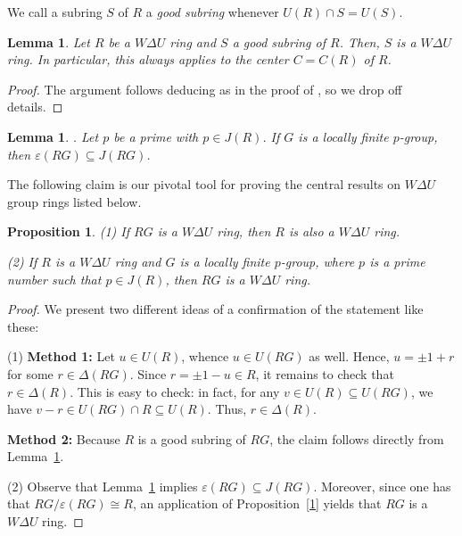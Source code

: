 \documentclass[12pt]{amsart}
\newtheorem{proposition}[theorem]{Proposition}
\newtheorem{lemma}[theorem]{Lemma}
\theoremstyle{definition}
\begin{document}
We call a subring $S$ of $R$ a {\it good subring} whenever $U(R) \cap S = U(S)$.

\begin{lemma}\label{goodsubring}
Let $R$ be a \(W\Delta U\) ring and \(S\) a good subring of \(R\). Then, \(S\) is a \(W\Delta U\) ring. In particular, this always applies to the center \(C = C(R)\) of \(R\).
\end{lemma}

\begin{proof}
The argument follows deducing as in the proof of \cite[Proposition 2.4(7)]{7}, so we drop off details.
\end{proof}

\begin{lemma}\label{4.14} \cite[Lemma $2$]{26}.
Let $p$ be a prime with $p\in J(R)$. If $G$ is a locally finite $p$-group, then $\varepsilon(RG) \subseteq J(RG)$.
\end{lemma}

The following claim is our pivotal tool for proving the central results on \(W\Delta U\) group rings listed below.

\begin{proposition}
(1) If $RG$ is a \(W\Delta U\) ring, then $R$ is also a \(W\Delta U\) ring.

(2) If \( R \) is a \(W\Delta U\) ring and \( G \) is a locally finite \( p \)-group, where \( p \) is a prime number such that \( p \in J(R) \), then \( RG \) is a \(W\Delta U\) ring.
\end{proposition}

\begin{proof} We present two different ideas of a confirmation of the statement like these:

\medskip

(1) \textbf{Method 1:} Let \(u \in U(R)\), whence \(u \in U(RG)\) as well. Hence, \(u = \pm1 + r\) for some \(r \in \Delta(RG)\). Since \(r = \pm1 - u \in R\), it remains to check that \(r \in \Delta(R)\). This is easy to check: in fact, for any \(v \in U(R) \subseteq U(RG)\), we have \(v - r \in U(RG) \cap R \subseteq U(R)\). Thus, \(r \in \Delta(R)\).

\medskip
	
\textbf{Method 2:} Because \(R\) is a good subring of \(RG\), the claim follows directly from Lemma~\ref{goodsubring}.

\medskip
	
(2) Observe that Lemma~\ref{4.14} implies \(\varepsilon(RG) \subseteq J(RG)\). Moreover, since one has that \(RG / \varepsilon(RG) \cong R\), an application of Proposition~\ref{1} yields that \(RG\) is a \(W\Delta U\) ring.
\end{proof}
\end{document}
